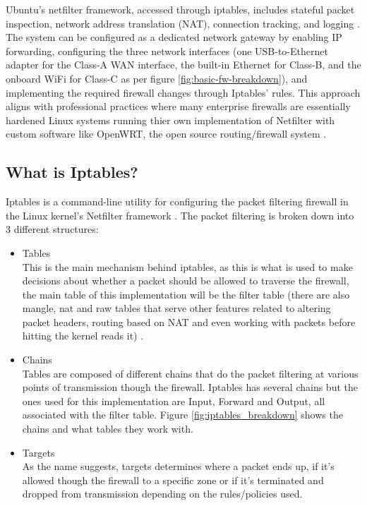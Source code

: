 Ubuntu's netfilter framework, accessed through iptables, includes stateful packet inspection, network address translation (NAT), connection tracking, and logging \parencite{GeeksforGeeks2025iptables}. The system can be configured as a dedicated network gateway by enabling IP forwarding, configuring the three network interfaces (one USB-to-Ethernet adapter for the Class-A WAN interface, the built-in Ethernet for Class-B, and the onboard WiFi for Class-C as per figure \ref{fig:basic-fw-breakdown}), and implementing the required firewall changes through Iptables' rules. This approach aligns with professional practices where many enterprise firewalls are essentially hardened Linux systems running thier own implementation of Netfilter with custom software \parencite{IPv6Hawaii2024FirewallPerformance} like OpenWRT, the open source routing/firewall system \parencite{OpenWrt2024Official}.

\subsection{What is Iptables?}
Iptables is a command-line utility for configuring the packet filtering firewall in the Linux kernel's Netfilter framework \parencite{Linux2024IptablesManual}. The packet filtering is broken down into 3 different structures:
\begin{itemize}
    \item Tables \\
    This is the main mechanism behind iptables, as this is what is used to make decisions about whether a packet should be allowed to traverse the firewall, the main table of this implementation will be the filter table (there are also mangle, nat and raw tables that serve other features related to altering packet headers, routing based on NAT and even working with packets before hitting the kernel reads it) \parencite{BooleanWorld2024IptablesGuide}.
    \item Chains \\
    Tables are composed of different chains that do the packet filtering at various points of transmission though the firewall. Iptables has several chains but the ones used for this implementation are Input, Forward and Output, all associated with the filter table. Figure \ref{fig:iptables_breakdown} shows the chains and what tables they work with.
    \item Targets \\
    As the name suggests, targets determines where a packet ends up, if it's allowed though the firewall to a specific zone or if it's terminated and dropped from transmission depending on the rules/policies used.\parencite{DigitalOcean2024IptablesTutorial}
\end{itemize}

